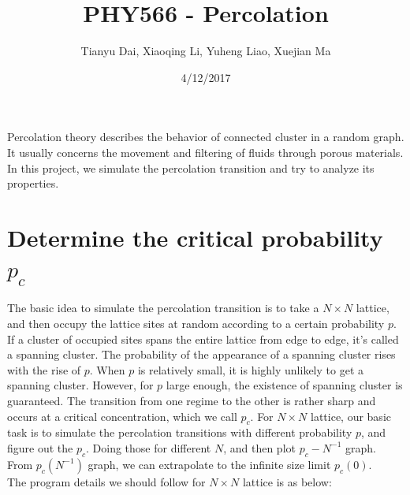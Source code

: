 \documentclass{article}
\author{Tianyu Dai, Xiaoqing Li, Yuheng Liao, Xuejian Ma}
\title{PHY566 - Percolation}
\begin{document}
\date{4/12/2017}
\maketitle
Percolation theory describes the behavior of connected cluster in a random graph. It usually concerns the movement and filtering of fluids through porous materials. In this project, we simulate the percolation transition and try to analyze its properties.
\section{Determine the critical probability $p_c$}
The basic idea to simulate the percolation transition is to take a $N\times N$ lattice, and then occupy the lattice sites at random according to a certain probability $p$. If a cluster of occupied sites spans the entire lattice from edge to edge, it's called a spanning cluster. The probability of the appearance of a spanning cluster rises with the rise of $p$. When $p$ is relatively small, it is highly unlikely to get a spanning cluster. However, for $p$ large enough, the existence of spanning cluster is guaranteed. The transition from one regime to the other is rather sharp and occurs at a critical concentration, which we call $p_c$. For $N\times N$ lattice, our basic task is to simulate the percolation transitions with different probability $p$, and figure out the $p_c$. Doing those for different $N$, and then plot $p_c - N^{-1}$ graph. From $p_c(N^{-1})$ graph, we can extrapolate to the infinite size limit $p_c(0)$.\\
\indent The program details we should follow for $N\times N$ lattice is as below:\\
\end{document}
